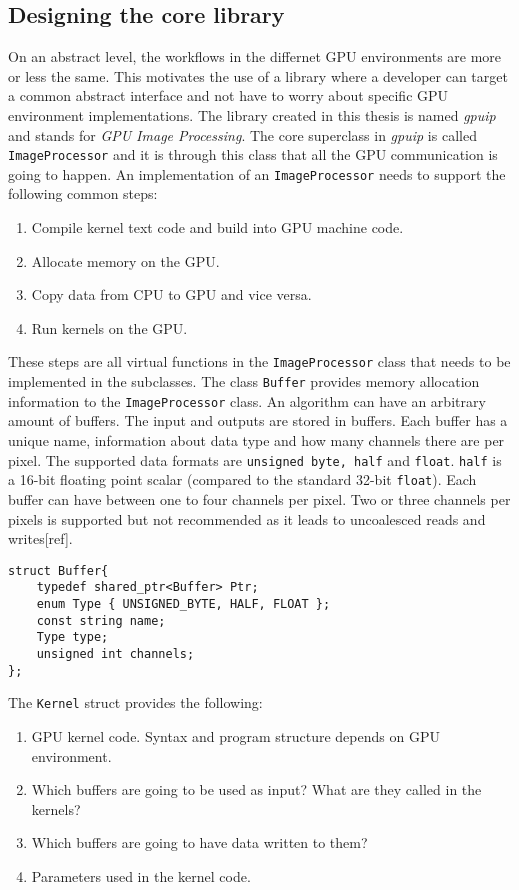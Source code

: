 \subsection {Designing the core library}

On an abstract level, the workflows in the differnet GPU environments are more or less the same. This motivates the use of a library where a developer can target a common abstract interface and not have to worry about specific GPU environment implementations. The library created in this thesis is named \emph{gpuip} and stands for \emph {GPU Image Processing}. The core superclass in \emph{gpuip} is called {\tt ImageProcessor} and it is through this class that all the GPU communication is going to happen. An implementation of an {\tt ImageProcessor} needs to support the following common steps:

\begin{enumerate}
\item Compile kernel text code and build into GPU machine code.
\item Allocate memory on the GPU.
\item Copy data from CPU to GPU and vice versa.
\item Run kernels on the GPU.
\end{enumerate}

These steps are all virtual functions in the {\tt ImageProcessor} class that needs to be implemented in the subclasses. The class {\tt Buffer} provides memory allocation information to the {\tt ImageProcessor} class. An algorithm can have an arbitrary amount of buffers. The input and outputs are stored in buffers. Each buffer has a unique name, information about data type and how many channels there are per pixel. The supported data formats are {\tt unsigned byte, half} and {\tt float}. {\tt half} is a 16-bit floating point scalar (compared to the standard 32-bit {\tt float}). Each buffer can have between one to four channels per pixel. Two or three channels per pixels is supported but not recommended as it leads to uncoalesced reads and writes[ref]. 
\newline
\renewcommand{\lstlistingname}{Code}
\begin{lstlisting}[caption= Buffer struct, label=bufferapi]
struct Buffer{
    typedef shared_ptr<Buffer> Ptr;
    enum Type { UNSIGNED_BYTE, HALF, FLOAT };
    const string name;
    Type type;
    unsigned int channels;
};
\end{lstlisting}
\newpage
The {\tt Kernel} struct provides the following:
\begin{enumerate}
\item GPU kernel code. Syntax and program structure depends on GPU environment.
\item Which buffers are going to be used as input? What are they called in the kernels?
\item Which buffers are going to have data written to them?
\item Parameters used in the kernel code.
\end{enumerate}

